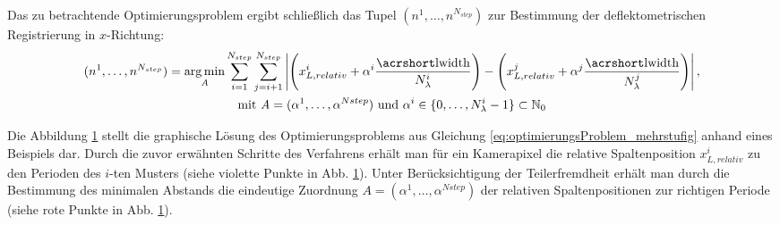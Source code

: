 Das zu betrachtende Optimierungsproblem ergibt schließlich das Tupel $(n^1,\ldots, n^{N_{step}})$ zur Bestimmung der deflektometrischen Registrierung in $x$-Richtung:
%
\begin{equation}\label{eq:optimierungsProblem_mehrstufig}
	\begin{gathered}	
		(n^1,\ldots, n^{N_{step}}) = \argmin_{\mathrm{\textit{A}}}
		\sum\limits_{i = 1}^{N_{step}}
		\sum\limits_{j = i + 1}^{N_{step}}
		\left\lvert
			\Bigg(
				x_{L,relativ}^i + \alpha^i \dfrac{\acrshortmath{lwidth}}{N_\lambda^i}
			\Bigg)
			-
			\Bigg(		
				x_{L,relativ}^j + \alpha^j \dfrac{\acrshortmath{lwidth}}{N_\lambda^j}
			\Bigg)
		\right\rvert,\\
		\text{mit} ~\mathrm{\textit{A}} = (\alpha^1,\ldots,\alpha^{N{step}}) ~\text{und} ~\alpha^i \in \lbrace 0,\ldots, N_\lambda^i - 1 \rbrace \subset \mathbb{N}_0
	\end{gathered}
\end{equation}

{
	\begin{figure}[H]
		\centering
		
		\label{tikz:abbBestimmungEindeutigerPosition}
	\end{figure}
}

\noindent
Die Abbildung \ref{tikz:abbBestimmungEindeutigerPosition} stellt die graphische Lösung des Optimierungsproblems aus Gleichung \ref{eq:optimierungsProblem_mehrstufig} anhand eines Beispiels dar.
Durch die zuvor erwähnten Schritte des Verfahrens erhält man für ein Kamerapixel die relative Spaltenposition $x_{L,relativ}^i$ zu den Perioden des $i$-ten Musters (siehe violette Punkte in Abb. \ref{tikz:abbBestimmungEindeutigerPosition}).
Unter Berücksichtigung der Teilerfremdheit erhält man durch die Bestimmung des minimalen Abstands die eindeutige Zuordnung $\mathrm{\textit{A}} = (\alpha^1,\ldots,\alpha^{N{step}})$ der relativen Spaltenpositionen zur richtigen Periode (siehe rote Punkte in Abb. \ref{tikz:abbBestimmungEindeutigerPosition}).


